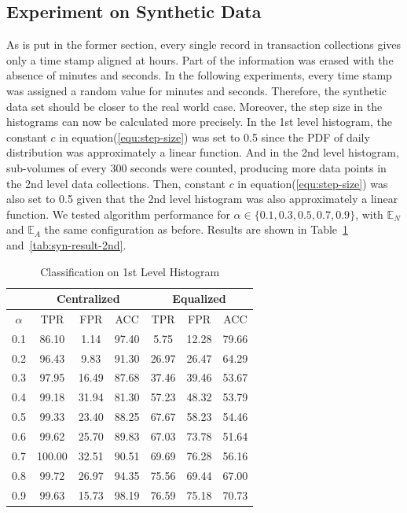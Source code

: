 \documentclass[10pt,conference,letterpaper]{IEEEtran}
\begin{document}
		\subsection{Experiment on Synthetic Data}\label{sec:exp-synthetic}
			As is put in the former section, every single record in transaction collections gives only a time stamp aligned at hours. Part of the information was erased with the absence of minutes and seconds. In the following experiments, every time stamp was assigned a random value for minutes and seconds. Therefore, the synthetic data set should be closer to the real world case. Moreover, the step size in the histograms can now be calculated more precisely. In the 1st level histogram, the constant $c$ in equation(\ref{equ:step-size}) was set to 0.5 since the PDF of daily distribution was approximately a linear function. And in the 2nd level histogram, sub-volumes of every 300 seconds were counted, producing more data points in the 2nd level data collections. Then, constant $c$ in equation(\ref{equ:step-size}) was also set to 0.5 given that the 2nd level histogram was also approximately a linear function.
			We tested algorithm performance for $\alpha \in \{0.1, 0.3, 0.5, 0.7, 0.9\}$, with $\mathbb{E}_N$ and $\mathbb{E}_A$ the same configuration as before. Results are shown in Table~\ref{tab:syn-result-1st} and~\ref{tab:syn-result-2nd}.
			
			\begin{table}[!ht]
				\centering
				\caption{Classification on 1st Level Histogram}
				\label{tab:syn-result-1st}
				\begin{tabular}{|c|c|c|c|c|c|c|}
					\hline
					& \multicolumn{3}{c|}{Centralized} & \multicolumn{3}{c|}{Equalized}\\
					\hline
					$\alpha$ & TPR & FPR & ACC & TPR & FPR & ACC \\ 
					\hline
					0.1 & 86.10 & 1.14 & 97.40 & 5.75 & 12.28 & 79.66 \\ 
					\hline
					0.2 & 96.43 & 9.83 & 91.30 & 26.97 & 26.47 & 64.29 \\ 
					\hline
					0.3 & 97.95 & 16.49 & 87.68 & 37.46 & 39.46 & 53.67 \\ 
					\hline
					0.4 & 99.18 & 31.94 & 81.30 & 57.23 & 48.32 & 53.79 \\ 
					\hline
					0.5 & 99.33 & 23.40 & 88.25 & 67.67 & 58.23 & 54.46 \\ 
					\hline
					0.6 & 99.62 & 25.70 & 89.83 & 67.03 & 73.78 & 51.64 \\ 
					\hline
					0.7 & 100.00 & 32.51 & 90.51 & 69.69 & 76.28 & 56.16 \\ 
					\hline
					0.8 & 99.72 & 26.97 & 94.35 & 75.56 & 69.44 & 67.00 \\ 
					\hline
					0.9 & 99.63 & 15.73 & 98.19 & 76.59 & 75.18 & 70.73\\
					\hline
				\end{tabular} 
			\end{table}
			
\end{document}
